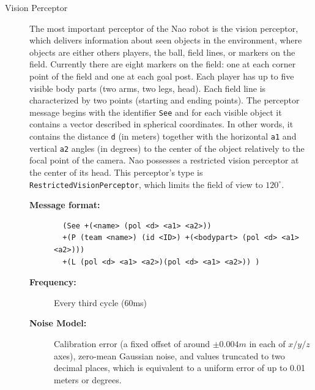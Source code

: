 \begin{description}
  \item [Vision Perceptor]
The most important perceptor of the Nao robot is the vision perceptor, which delivers information about seen objects in the environment, where objects are either others players, the ball, field lines, or markers on the field. Currently there are eight markers on the field: one at each corner point of the field and one at each goal post. Each player has up to five visible body parts (two arms, two legs, head). Each field line is characterized by two points (starting and ending points). The perceptor message begins with the identifier \texttt{See} and for each visible object it contains a vector described in spherical coordinates. In other words, it contains the distance \texttt{d} (in meters) together with the horizontal \texttt{a1} and vertical \texttt{a2} angles (in degrees) to the center of the object relatively to the focal point of the camera. Nao possesses a restricted vision perceptor at the center of its head. This perceptor's type is \texttt{RestrictedVisionPerceptor}, which limits the field of view to $120^{\circ}$. 

 \begin{description}
  \item[{\bf Message format:}]
  \begin{verbatim}
  (See +(<name> (pol <d> <a1> <a2>))
  +(P (team <name>) (id <ID>) +(<bodypart> (pol <d> <a1> <a2>)))
  +(L (pol <d> <a1> <a2>)(pol <d> <a1> <a2>)) )\end{verbatim}
  \item[{\bf Frequency:}]
 Every third cycle (60ms)
  \item[{\bf Noise Model:}] Calibration error (a fixed offset of around $\pm0.004m$ in each of $x/y/z$ axes), zero-mean Gaussian noise, and values truncated to two decimal places, which is equivalent to a uniform error of up to 0.01 meters or degrees.
  \end{description}



\end{description}
